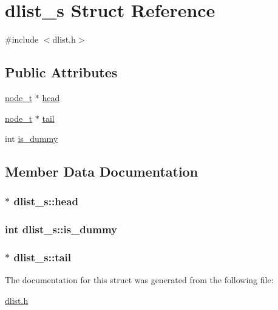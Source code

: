 \hypertarget{structdlist__s}{\section{dlist\-\_\-s Struct Reference}
\label{structdlist__s}
}


{\ttfamily \#include $<$dlist.\-h$>$}

\subsection*{Public Attributes}
\begin{DoxyCompactItemize}
\item 
\hyperlink{node_8h_a33b99e5345d46cf63926673aa2b9ff83}{node\-\_\-t} $\ast$ \hyperlink{structdlist__s_a768ee634ee23ba3b8374f0ce93712860}{head}
\item 
\hyperlink{node_8h_a33b99e5345d46cf63926673aa2b9ff83}{node\-\_\-t} $\ast$ \hyperlink{structdlist__s_a3ff0ae73472ba1494666927c58b4e3d3}{tail}
\item 
int \hyperlink{structdlist__s_a7273e9f7416118523aa610a493e017d3}{is\-\_\-dummy}
\end{DoxyCompactItemize}


\subsection{Member Data Documentation}
\hypertarget{structdlist__s_a768ee634ee23ba3b8374f0ce93712860}{
\subsubsection[{head}]{$\ast$ dlist\-\_\-s\-::head}}\label{structdlist__s_a768ee634ee23ba3b8374f0ce93712860}
\hypertarget{structdlist__s_a7273e9f7416118523aa610a493e017d3}{
\subsubsection[{is\-\_\-dummy}]{\setlength{\rightskip}{0pt plus 5cm}int dlist\-\_\-s\-::is\-\_\-dummy}}\label{structdlist__s_a7273e9f7416118523aa610a493e017d3}
\hypertarget{structdlist__s_a3ff0ae73472ba1494666927c58b4e3d3}{
\subsubsection[{tail}]{$\ast$ dlist\-\_\-s\-::tail}}\label{structdlist__s_a3ff0ae73472ba1494666927c58b4e3d3}


The documentation for this struct was generated from the following file\-:\begin{DoxyCompactItemize}
\item 
\hyperlink{dlist_8h}{dlist.\-h}\end{DoxyCompactItemize}

